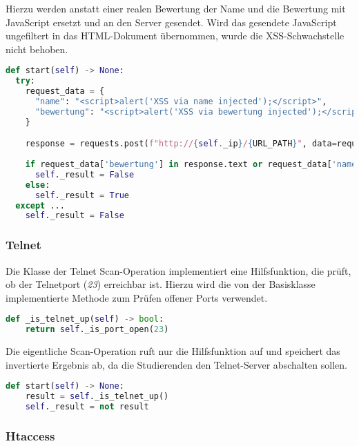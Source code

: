 Hierzu werden anstatt einer realen Bewertung der Name und die Bewertung mit JavaScript ersetzt und an den Server gesendet. Wird das gesendete JavaScript ungefiltert in das HTML-Dokument übernommen, wurde die XSS-Schwachstelle nicht behoben.
\begin{lstlisting}[language=Python, frame=single, caption={Big Brother XSS Save}, captionpos=b, label={lst:bigbrother-xss-save}]
def start(self) -> None:
  try:
    request_data = {
      "name": "<script>alert('XSS via name injected');</script>",
      "bewertung": "<script>alert('XSS via bewertung injected');</script>"
    }

    response = requests.post(f"http://{self._ip}/{URL_PATH}", data=request_data)
    
    if request_data['bewertung'] in response.text or request_data['name'] in response.text:
      self._result = False
    else:
      self._result = True
  except ...
    self._result = False
\end{lstlisting}

\subsubsection{Telnet}
Die Klasse der Telnet Scan-Operation implementiert eine Hilfsfunktion, die prüft, ob der Telnetport (\textit{23}) erreichbar ist. Hierzu wird die von der Basisklasse implementierte Methode zum Prüfen offener Ports verwendet.

\begin{lstlisting}[language=Python, frame=single, caption={Big Brother Telnet}, captionpos=b, label={lst:bigbrother-telnet}]
def _is_telnet_up(self) -> bool:
	return self._is_port_open(23)
\end{lstlisting}

Die eigentliche Scan-Operation ruft nur die Hilfsfunktion auf und speichert das invertierte Ergebnis ab, da die Studierenden den Telnet-Server abschalten sollen.

\begin{lstlisting}[language=Python, frame=single, caption={Big Brother Telnet}, captionpos=b, label={lst:bigbrother-telnet-start}]
def start(self) -> None:
	result = self._is_telnet_up()
	self._result = not result
\end{lstlisting}

\subsubsection{Htaccess}

